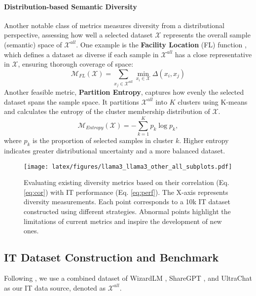 \paragraph{Distribution-based Semantic Diversity}  
Another notable class of metrics measures diversity from a distributional perspective, assessing how well a selected dataset $\mathcal{X}$ represents the overall sample (semantic) space of $\mathcal{X}^{all}$. 
One example is the \textbf{Facility Location} (FL) function \cite{farahani2009facility-FL}, which defines a dataset as diverse if each sample in $\mathcal{X}^{all}$ has a close representative in $\mathcal{X}$, ensuring thorough coverage of space:
\begin{equation}
    \mathcal{M}_{FL}(\mathcal{X}) = \sum_{x_j \in \mathcal{X}^{all}}\min_{x_i \in \mathcal{X}} \Delta(x_i, x_j)
\end{equation}  
Another feasible metric, \textbf{Partition Entropy}, captures how evenly the selected dataset spans the sample space. It partitions $\mathcal{X}^{all}$ into $K$ clusters using K-means and calculates the entropy of the cluster membership distribution of $\mathcal{X}$.
\begin{equation}
    \mathcal{M}_{Entropy}(\mathcal{X}) = -\sum_{k=1}^{K} p_k \log p_k,  
\end{equation}  
where $p_k$ is the proportion of selected samples in cluster $k$. Higher entropy indicates greater distributional uncertainty and a more balanced dataset.

\begin{figure*}[t!]
    \centering
        \texttt{[image: latex/figures/llama3\_llama3\_other\_all\_subplots.pdf]}
    \caption{Evaluating existing diversity metrics based on their correlation (Eq. \ref{eq:cor}) with IT performance (Eq. \ref{eq:perf}). The X-axis represents diversity measurements. Each point corresponds to a 10k IT dataset constructed using different strategies. Abnormal points highlight the limitations of current metrics and inspire the development of new ones.}
    \label{fig:exist}
\end{figure*}

\subsection{IT Dataset Construction and Benchmark}

Following \citealp{liu2023makes}, we use a combined dataset of WizardLM \cite{xu2024wizardlm}, ShareGPT \cite{chiang2023vicuna-ShareGPT}, and UltraChat \cite{ding2023enhancing-UltraChat} as our IT data source, denoted as $\mathcal{X}^{all}$.

